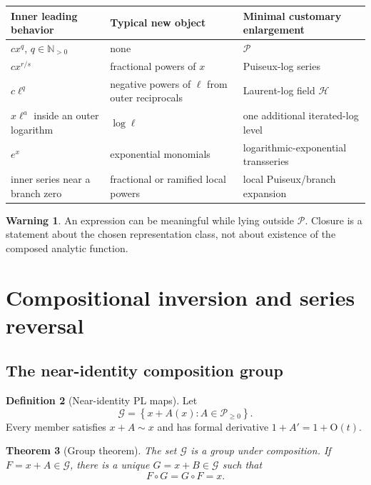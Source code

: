 \documentclass[11pt,oneside]{article}
\numberwithin{equation}{section}
\newtheorem{theorem}{Theorem}[section]
\theoremstyle{definition}
\newtheorem{definition}[theorem]{Definition}
\newtheorem{warning}[theorem]{Warning}
\newcommand{\N}{\mathbb N}
\newcommand{\PL}{\mathscr P}
\newcommand{\HL}{\mathscr H}
\newcommand{\Gnear}{\mathscr G}
\newcommand{\bigO}{\mathrm{O}}
\newcommand{\as}{\sim}
\begin{document}
\begin{center}
\begin{tabularx}{0.95\textwidth}{@{}>{\raggedright\arraybackslash}p{}
>{\raggedright\arraybackslash}p{}X@{}}
\toprule
Inner leading behavior & Typical new object & Minimal customary enlargement\\
\midrule
\(cx^q\), \(q\in\N_{>0}\) & none & \(\PL\)\\
\(cx^{r/s}\) & fractional powers of \(x\) & Puiseux-log series\\
\(c\ell^q\) & negative powers of \(\ell\) from outer reciprocals & Laurent-log field \(\HL\)\\
\(x\ell^a\) inside an outer logarithm & \(\log\ell\) & one additional iterated-log level\\
\(e^x\) & exponential monomials & logarithmic-exponential transseries\\
inner series near a branch zero & fractional or ramified local powers & local Puiseux/branch expansion\\
\bottomrule
\end{tabularx}
\end{center}

\begin{warning}
An expression can be meaningful while lying outside \(\PL\).  Closure is a
statement about the chosen representation class, not about existence of the
composed analytic function.
\end{warning}

\section{Compositional inversion and series reversal}\label{sec:reversion}

\subsection{The near-identity composition group}

\begin{definition}[Near-identity PL maps]
Let
\begin{equation}\label{eq:near-group}
  \Gnear=\left\{x+A(x):A\in\PL_{\ge0}\right\}.
\end{equation}
Every member satisfies \(x+A\as x\) and has formal derivative
\(1+A'=1+\bigO(t)\).
\end{definition}

\begin{theorem}[Group theorem]\label{thm:near-group}
The set \(\Gnear\) is a group under composition.  If
\(F=x+A\in\Gnear\), there is a unique
\(G=x+B\in\Gnear\) such that
\begin{equation}\label{eq:two-sided-inverse}
  F\circ G=G\circ F=x.
\end{equation}
\end{theorem}
\end{document}
